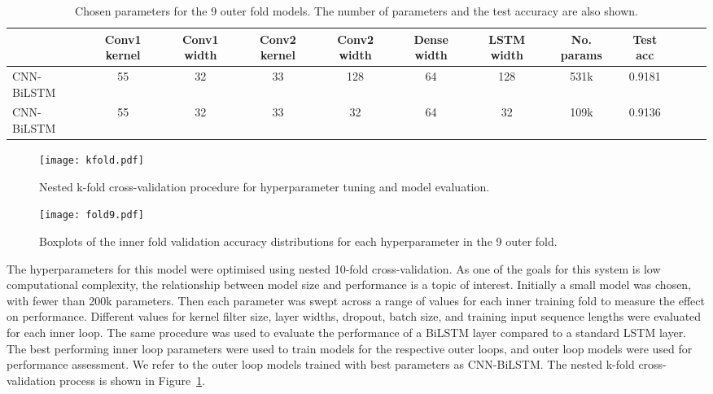 \documentclass{article}
\begin{document}
\vspace{-2mm}

\begin{table*}[htb]
    \footnotesize
    \centering
    \begin{tabular*}{\textwidth}{@{\extracolsep{\fill}}lccccccccccc}
        \toprule
            &Conv1 kernel &Conv1 width    &Conv2 kernel 
        &Conv2 width &Dense width   &LSTM width &No. params &Test acc\\
        \midrule
        CNN-BiLSTM     & 55	& 32	& 33	& 128	& 64	& 128	& 531k	& 0.9181\\
        CNN-BiLSTM    & 55	& 32	& 33	& 32	& 64	& 32	& 109k	& 0.9136\\
        \bottomrule
    \end{tabular*}
\caption{Chosen parameters for the 9 outer fold models. The number of parameters and the test accuracy are also shown.}
    \label{tab:fold9}
    \vspace{-1mm}
\end{table*}

\begin{figure}\begin{minipage}[b]{1.0\linewidth}
  \centering
  \centerline{\texttt{[image: kfold.pdf]}}
\end{minipage}
\vspace{-6mm}
\caption{Nested k-fold cross-validation procedure for hyperparameter tuning and model evaluation.}
\label{fig:kfold}
\vspace{-2mm}
\end{figure}

\begin{figure*}[htb]
  \centering
  \texttt{[image: fold9.pdf]}
\vspace{-6mm}
\caption{Boxplots of the inner fold validation accuracy distributions for each hyperparameter in the 9 outer fold.}
\label{fig:fold9}
\vspace{-3mm}
\end{figure*}

The hyperparameters for this model were optimised using nested 10-fold cross-validation.
As one of the goals for this system is low computational complexity, the relationship between model size and performance is a topic of interest.
Initially a small model was chosen, with fewer than 200k parameters.
Then each parameter was swept across a range of values for each inner training fold to measure the effect on performance.
Different values for kernel filter size, layer widths, dropout, batch size, and training input sequence lengths were evaluated for each inner loop.
The same procedure was used to evaluate the performance of a BiLSTM layer compared to a standard LSTM layer.
The best performing inner loop parameters were used to train models for the respective outer loops, and outer loop models were used for performance assessment.
We refer to the outer loop models trained with best parameters as CNN-BiLSTM.
The nested k-fold cross-validation process is shown in \mbox{Figure \ref{fig:kfold}}.
\end{document}
